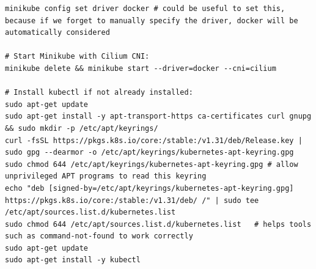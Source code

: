 \documentclass{article}
\begin{document}
\begin{enumerate}
\begin{lstlisting}
minikube config set driver docker # could be useful to set this, because if we forget to manually specify the driver, docker will be automatically considered

# Start Minikube with Cilium CNI:
minikube delete && minikube start --driver=docker --cni=cilium

# Install kubectl if not already installed:
sudo apt-get update
sudo apt-get install -y apt-transport-https ca-certificates curl gnupg && sudo mkdir -p /etc/apt/keyrings/
curl -fsSL https://pkgs.k8s.io/core:/stable:/v1.31/deb/Release.key | sudo gpg --dearmor -o /etc/apt/keyrings/kubernetes-apt-keyring.gpg
sudo chmod 644 /etc/apt/keyrings/kubernetes-apt-keyring.gpg # allow unprivileged APT programs to read this keyring
echo "deb [signed-by=/etc/apt/keyrings/kubernetes-apt-keyring.gpg] https://pkgs.k8s.io/core:/stable:/v1.31/deb/ /" | sudo tee /etc/apt/sources.list.d/kubernetes.list
sudo chmod 644 /etc/apt/sources.list.d/kubernetes.list   # helps tools such as command-not-found to work correctly
sudo apt-get update
sudo apt-get install -y kubectl
  
      \end{lstlisting}

      
      
    


\end{enumerate}
\end{document}
